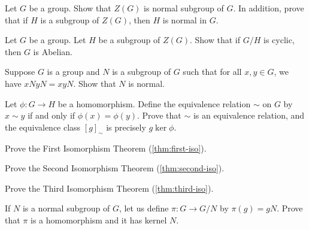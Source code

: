 \documentclass[./main.tex]{subfiles}
\begin{document}
\begin{exercise}
\label{ex:center-is-always-normal}
    Let $G$ be a group. Show that $Z(G)$ is normal subgroup of $G$. In addition,
    prove that if $H$ is a subgroup of $Z(G)$, then $H$ is normal in $G$.
\end{exercise}

\begin{exercise}
    Let $G$ be a group. Let $H$ be a subgroup of $Z(G)$. Show that if $G/H$ is
    cyclic, then $G$ is Abelian. 
\end{exercise}

\begin{exercise}
\label{ex:converse-of-quotient-groups-existence}
    Suppose $G$ is a group and $N$ is a subgroup of $G$ such that for all $x, y
    \in G$, we have $xN yN = xyN$. Show that $N$ is normal.
\end{exercise}

\begin{exercise}
\label{ex:homomorphism-induces-equiv-relation}
    Let $\phi: G \to H$ be a homomorphism. Define the equivalence relation
    $\sim$ on $G$ by $x \sim y$ if and only if $\phi(x) = \phi(y)$. Prove that $\sim$
    is an equivalence relation, and the equivalence class $[g]_\sim$ is
    precisely $g\ker\phi$.
\end{exercise}

\begin{exercise}
\label{ex:prove-first-iso}
    Prove the First Isomorphism Theorem (\cref{thm:first-iso}).
\end{exercise}

\begin{exercise}
\label{ex:prove-second-iso}
    Prove the Second Isomorphism Theorem (\cref{thm:second-iso}).
\end{exercise}

\begin{exercise}
\label{ex:prove-third-iso}
    Prove the Third Isomorphism Theorem (\cref{thm:third-iso}).
\end{exercise}

\begin{exercise}
\label{ex:kernel-of-projection}
    If $N$ is a normal subgroup of $G$, let us define $\pi: G \to G/N$ by
    $\pi(g) = gN$. Prove that $\pi$ is a homomorphism and it has kernel $N$.
\end{exercise}
\end{document}
